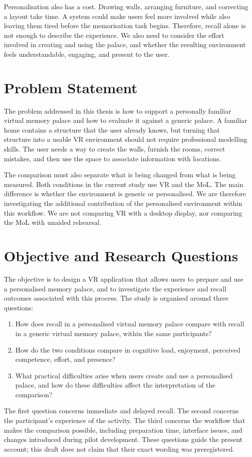 Personalisation also has a cost. Drawing walls, arranging furniture, and correcting a layout take time. A system could make users feel more involved while also leaving them tired before the memorisation task begins. Therefore, recall alone is not enough to describe the experience. We also need to consider the effort involved in creating and using the palace, and whether the resulting environment feels understandable, engaging, and present to the user.

\section{Problem Statement}
The problem addressed in this thesis is how to support a personally familiar virtual memory palace and how to evaluate it against a generic palace. A familiar home contains a structure that the user already knows, but turning that structure into a usable VR environment should not require professional modelling skills. The user needs a way to create the walls, furnish the rooms, correct mistakes, and then use the space to associate information with locations.

The comparison must also separate what is being changed from what is being measured. Both conditions in the current study use VR and the MoL. The main difference is whether the environment is generic or personalised. We are therefore investigating the additional contribution of the personalised environment within this workflow. We are not comparing VR with a desktop display, nor comparing the MoL with unaided rehearsal.

\section{Objective and Research Questions}
The objective is to design a VR application that allows users to prepare and use a personalised memory palace, and to investigate the experience and recall outcomes associated with this process. The study is organised around three questions:
\begin{enumerate}
    \item How does recall in a personalised virtual memory palace compare with recall in a generic virtual memory palace, within the same participants?
    \item How do the two conditions compare in cognitive load, enjoyment, perceived competence, effort, and presence?
    \item What practical difficulties arise when users create and use a personalised palace, and how do these difficulties affect the interpretation of the comparison?
\end{enumerate}
The first question concerns immediate and delayed recall. The second concerns the participant's experience of the activity. The third concerns the workflow that makes the comparison possible, including preparation time, interface issues, and changes introduced during pilot development. These questions guide the present account; this draft does not claim that their exact wording was preregistered.

